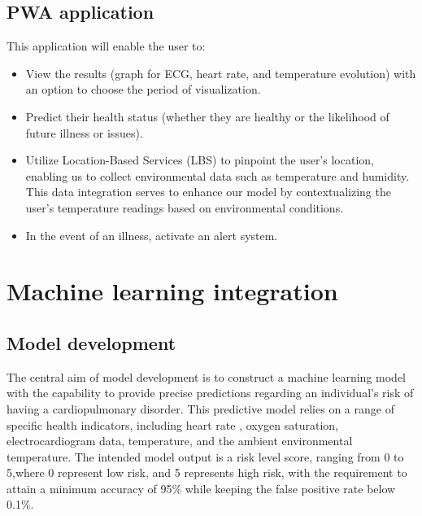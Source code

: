 \documentclass[12pt]{article}
\begin{document}
\subsection{PWA application}
This application will enable the user to:
\begin{itemize}
    \item View the results (graph for ECG, heart rate, and temperature evolution) with an option to choose the period of visualization.
    \item Predict their health status (whether they are healthy or the likelihood of future illness or issues).
    \item Utilize Location-Based Services (LBS) to pinpoint the user's location, enabling us to collect environmental data such as temperature and humidity. This data integration serves to enhance our model by contextualizing the user's temperature readings based on environmental conditions.
    \item In the event of an illness, activate an alert system.
    
\end{itemize}
\section{Machine learning integration}
\subsection{Model development}
The central aim of model development is to construct a machine learning model with the capability to provide precise predictions regarding an individual's risk of having a cardiopulmonary disorder. This predictive model relies on a range of specific health indicators, including heart rate , oxygen saturation, electrocardiogram data, temperature, and the ambient environmental temperature. The intended model output is a risk level score, ranging from 0 to 5,where 0 represent low risk, and 5 represents high risk, with the requirement to attain a minimum accuracy of 95\% while keeping the false positive rate below 0.1\%.
\end{document}
